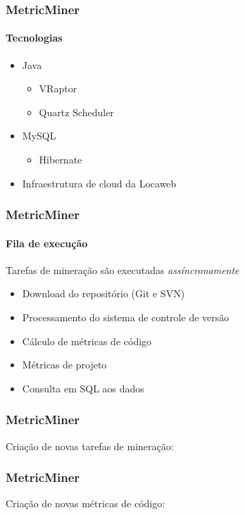 \documentclass[brazil]{beamer}
\begin{document}
	\begin{frame}
		\frametitle{MetricMiner}
		\framesubtitle{Tecnologias}

		\begin{itemize}
			\item Java
			\begin{itemize}
				\item VRaptor
				\item Quartz Scheduler
			\end{itemize}
			\item MySQL
			\begin{itemize}
				\item Hibernate
			\end{itemize}
			\item Infraestrutura de cloud da Locaweb
		\end{itemize}
	\end{frame}

	\begin{frame}
		\frametitle{MetricMiner}
		\framesubtitle{Fila de execução}

		Tarefas de mineração são executadas \emph{assíncronamente}

		\begin{itemize}
			\item Download do repositório (Git e SVN)
			\item Processamento do sistema de controle de versão
			\item Cálculo de métricas de código
			\item Métricas de projeto
			\item Consulta em SQL aos dados
		\end{itemize}
	\end{frame}

	\begin{frame}
		\frametitle{MetricMiner}

		Criação de novas tarefas de mineração:

		\begin{scriptsize}
			
		\end{scriptsize}

	\end{frame}


	\begin{frame}
		\frametitle{MetricMiner}

		Criação de novas métricas de código:

		\begin{scriptsize}
			
		\end{scriptsize}

	\end{frame}
\end{document}
